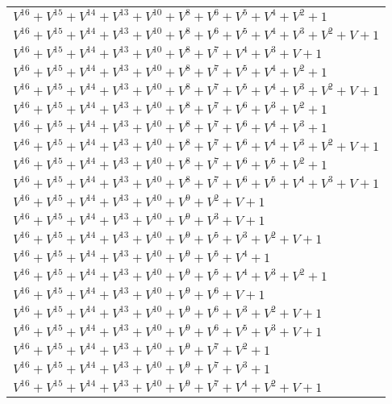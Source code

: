 \documentclass[12pt]{article}
\begin{document}
\begin{adjustwidth}{-4cm}{}
\begin{center}
\begin{longtable}{|l|}
$V^{16}  +V^{15}  +V^{14}  +V^{13}  +V^{10}  +V^{8}  +V^{6}  +V^{5}  +V^{4}  +V^{2}  + 1$ \\
$V^{16}  +V^{15}  +V^{14}  +V^{13}  +V^{10}  +V^{8}  +V^{6}  +V^{5}  +V^{4}  +V^{3}  +V^{2}  + V + 1$ \\
$V^{16}  +V^{15}  +V^{14}  +V^{13}  +V^{10}  +V^{8}  +V^{7}  +V^{4}  +V^{3}  + V + 1$ \\
$V^{16}  +V^{15}  +V^{14}  +V^{13}  +V^{10}  +V^{8}  +V^{7}  +V^{5}  +V^{4}  +V^{2}  + 1$ \\
$V^{16}  +V^{15}  +V^{14}  +V^{13}  +V^{10}  +V^{8}  +V^{7}  +V^{5}  +V^{4}  +V^{3}  +V^{2}  + V + 1$ \\
$V^{16}  +V^{15}  +V^{14}  +V^{13}  +V^{10}  +V^{8}  +V^{7}  +V^{6}  +V^{3}  +V^{2}  + 1$ \\
$V^{16}  +V^{15}  +V^{14}  +V^{13}  +V^{10}  +V^{8}  +V^{7}  +V^{6}  +V^{4}  +V^{3}  + 1$ \\
$V^{16}  +V^{15}  +V^{14}  +V^{13}  +V^{10}  +V^{8}  +V^{7}  +V^{6}  +V^{4}  +V^{3}  +V^{2}  + V + 1$ \\
$V^{16}  +V^{15}  +V^{14}  +V^{13}  +V^{10}  +V^{8}  +V^{7}  +V^{6}  +V^{5}  +V^{2}  + 1$ \\
$V^{16}  +V^{15}  +V^{14}  +V^{13}  +V^{10}  +V^{8}  +V^{7}  +V^{6}  +V^{5}  +V^{4}  +V^{3}  + V + 1$ \\
$V^{16}  +V^{15}  +V^{14}  +V^{13}  +V^{10}  +V^{9}  +V^{2}  + V + 1$ \\
$V^{16}  +V^{15}  +V^{14}  +V^{13}  +V^{10}  +V^{9}  +V^{3}  + V + 1$ \\
$V^{16}  +V^{15}  +V^{14}  +V^{13}  +V^{10}  +V^{9}  +V^{5}  +V^{3}  +V^{2}  + V + 1$ \\
$V^{16}  +V^{15}  +V^{14}  +V^{13}  +V^{10}  +V^{9}  +V^{5}  +V^{4}  + 1$ \\
$V^{16}  +V^{15}  +V^{14}  +V^{13}  +V^{10}  +V^{9}  +V^{5}  +V^{4}  +V^{3}  +V^{2}  + 1$ \\
$V^{16}  +V^{15}  +V^{14}  +V^{13}  +V^{10}  +V^{9}  +V^{6}  + V + 1$ \\
$V^{16}  +V^{15}  +V^{14}  +V^{13}  +V^{10}  +V^{9}  +V^{6}  +V^{3}  +V^{2}  + V + 1$ \\
$V^{16}  +V^{15}  +V^{14}  +V^{13}  +V^{10}  +V^{9}  +V^{6}  +V^{5}  +V^{3}  + V + 1$ \\
$V^{16}  +V^{15}  +V^{14}  +V^{13}  +V^{10}  +V^{9}  +V^{7}  +V^{2}  + 1$ \\
$V^{16}  +V^{15}  +V^{14}  +V^{13}  +V^{10}  +V^{9}  +V^{7}  +V^{3}  + 1$ \\
$V^{16}  +V^{15}  +V^{14}  +V^{13}  +V^{10}  +V^{9}  +V^{7}  +V^{4}  +V^{2}  + V + 1$ \\

\end{longtable}
\end{center}
\end{adjustwidth}
\end{document}
